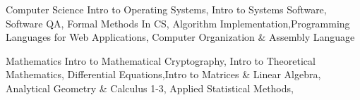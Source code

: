 
\vspace{0mm}
\begin{cvskills}

  \vspace{1mm}

  \cvskill
    {Computer Science} %
    {Intro to Operating Systems, Intro to Systems Software, Software QA, Formal Methods In CS, Algorithm Implementation,\newline Programming Languages for Web Applications, Computer Organization \& Assembly Language} %

   \cvskill
    {Mathematics} %
	{Intro to Mathematical Cryptography, Intro to Theoretical Mathematics, Differential Equations,\newline Intro to Matrices \& Linear Algebra, Analytical Geometry \& Calculus 1-3, Applied Statistical Methods, } %


\end{cvskills}
